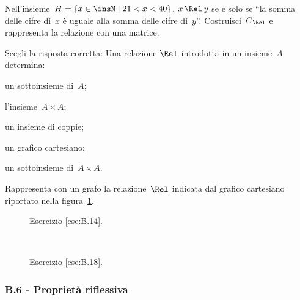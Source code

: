 \begin{multicols}{2}
\begin{esercizio}
\label{ese:B.16}
Nell'insieme~$H = \{ x \in \insN \mid  21 < x < 40 \}$, $x \,\Rel\, y$ se e solo se ``la somma delle cifre di~$x$ è uguale alla somma delle cifre di~$y$''.
Costruisci~$G_\Rel$ e rappresenta la relazione con una matrice.
\end{esercizio}

\begin{esercizio}
\label{ese:B.17}
Scegli la risposta corretta:
Una relazione $\Rel$ introdotta in un insieme~$A$ determina:
\begin{enumeratea}
 \item un sottoinsieme di~$A$;
 \item l'insieme~$A \times A$;
 \item un insieme di coppie;
 \item un grafico cartesiano;
 \item un sottoinsieme di~$A \times A$.
 \end{enumeratea}
\end{esercizio}

\begin{esercizio}
\label{ese:B.18}
Rappresenta con un grafo la relazione~$\Rel$ indicata dal grafico cartesiano riportato nella figura~\ref{fig:B.16}.
\end{esercizio}
\end{multicols}

\begin{figure}[t]
\begin{minipage}[b]{.69\textwidth}
 \centering
 
 \caption{Esercizio \ref{ese:B.14}.}\label{fig:B.15}
\end{minipage}\
\begin{minipage}[b]{.3\textwidth}
 \centering
 
 \caption{Esercizio \ref{ese:B.18}.}\label{fig:B.16}
\end{minipage}
\end{figure}
\pagebreak

\subsubsection*{B.6 - Proprietà riflessiva}

